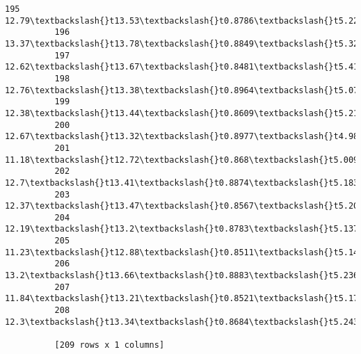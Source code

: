 \documentclass[11pt]{article}
\begin{document}
\begin{Verbatim}[commandchars=\\\{\}]
          195  12.79\textbackslash{}t13.53\textbackslash{}t0.8786\textbackslash{}t5.224\textbackslash{}t3.054\textbackslash{}t5.483\textbackslash{}t4.9{\ldots}
          196  13.37\textbackslash{}t13.78\textbackslash{}t0.8849\textbackslash{}t5.32\textbackslash{}t3.128\textbackslash{}t4.67\textbackslash{}t5.091\textbackslash{}t3
          197  12.62\textbackslash{}t13.67\textbackslash{}t0.8481\textbackslash{}t5.41\textbackslash{}t2.911\textbackslash{}t3.306\textbackslash{}t5.23{\ldots}
          198  12.76\textbackslash{}t13.38\textbackslash{}t0.8964\textbackslash{}t5.073\textbackslash{}t3.155\textbackslash{}t2.828\textbackslash{}t4.8{\ldots}
          199  12.38\textbackslash{}t13.44\textbackslash{}t0.8609\textbackslash{}t5.219\textbackslash{}t2.989\textbackslash{}t5.472\textbackslash{}t5.0{\ldots}
          200  12.67\textbackslash{}t13.32\textbackslash{}t0.8977\textbackslash{}t4.984\textbackslash{}t3.135\textbackslash{}t2.3\textbackslash{}t\textbackslash{}t4.7{\ldots}
          201  11.18\textbackslash{}t12.72\textbackslash{}t0.868\textbackslash{}t5.009\textbackslash{}t2.81\textbackslash{}t4.051\textbackslash{}t4.828\textbackslash{}t3
          202   12.7\textbackslash{}t13.41\textbackslash{}t0.8874\textbackslash{}t5.183\textbackslash{}t3.091\textbackslash{}t8.456\textbackslash{}t5\textbackslash{}t\textbackslash{}t3
          203  12.37\textbackslash{}t13.47\textbackslash{}t0.8567\textbackslash{}t5.204\textbackslash{}t2.96\textbackslash{}t3.919\textbackslash{}t5.00{\ldots}
          204  12.19\textbackslash{}t13.2\textbackslash{}t0.8783\textbackslash{}t5.137\textbackslash{}t2.981\textbackslash{}t3.631\textbackslash{}t4.87\textbackslash{}t3
          205  11.23\textbackslash{}t12.88\textbackslash{}t0.8511\textbackslash{}t5.14\textbackslash{}t2.795\textbackslash{}t4.325\textbackslash{}t5.00{\ldots}
          206  13.2\textbackslash{}t13.66\textbackslash{}t0.8883\textbackslash{}t5.236\textbackslash{}t3.232\textbackslash{}t8.315\textbackslash{}t5.05{\ldots}
          207  11.84\textbackslash{}t13.21\textbackslash{}t0.8521\textbackslash{}t5.175\textbackslash{}t2.836\textbackslash{}t3.598\textbackslash{}t5.0{\ldots}
          208  12.3\textbackslash{}t13.34\textbackslash{}t0.8684\textbackslash{}t5.243\textbackslash{}t2.974\textbackslash{}t5.637\textbackslash{}t5.06{\ldots}
          
          [209 rows x 1 columns]
\end{Verbatim}
            
\end{document}
